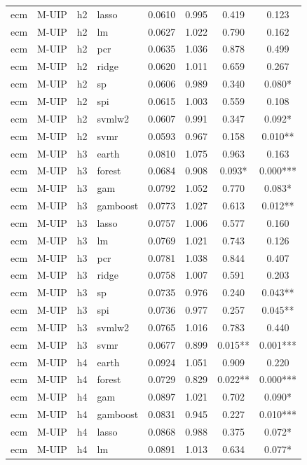 \begin{ThreePartTable}
\begin{longtable}[t]{llclcccc}
ecm & M-UIP & h2 & lasso & 0.0610 & 0.995 & 0.419 & 0.123\\
ecm & M-UIP & h2 & lm & 0.0627 & 1.022 & 0.790 & 0.162\\
ecm & M-UIP & h2 & pcr & 0.0635 & 1.036 & 0.878 & 0.499\\
ecm & M-UIP & h2 & ridge & 0.0620 & 1.011 & 0.659 & 0.267\\
ecm & M-UIP & h2 & sp & 0.0606 & 0.989 & 0.340 & 0.080*\\
ecm & M-UIP & h2 & spi & 0.0615 & 1.003 & 0.559 & 0.108\\
ecm & M-UIP & h2 & svmlw2 & 0.0607 & 0.991 & 0.347 & 0.092*\\
ecm & M-UIP & h2 & svmr & 0.0593 & 0.967 & 0.158 & 0.010**\\
\addlinespace
ecm & M-UIP & h3 & earth & 0.0810 & 1.075 & 0.963 & 0.163\\
ecm & M-UIP & h3 & forest & 0.0684 & 0.908 & 0.093* & 0.000***\\
ecm & M-UIP & h3 & gam & 0.0792 & 1.052 & 0.770 & 0.083*\\
ecm & M-UIP & h3 & gamboost & 0.0773 & 1.027 & 0.613 & 0.012**\\
ecm & M-UIP & h3 & lasso & 0.0757 & 1.006 & 0.577 & 0.160\\
ecm & M-UIP & h3 & lm & 0.0769 & 1.021 & 0.743 & 0.126\\
ecm & M-UIP & h3 & pcr & 0.0781 & 1.038 & 0.844 & 0.407\\
ecm & M-UIP & h3 & ridge & 0.0758 & 1.007 & 0.591 & 0.203\\
ecm & M-UIP & h3 & sp & 0.0735 & 0.976 & 0.240 & 0.043**\\
ecm & M-UIP & h3 & spi & 0.0736 & 0.977 & 0.257 & 0.045**\\
ecm & M-UIP & h3 & svmlw2 & 0.0765 & 1.016 & 0.783 & 0.440\\
ecm & M-UIP & h3 & svmr & 0.0677 & 0.899 & 0.015** & 0.001***\\
\addlinespace
ecm & M-UIP & h4 & earth & 0.0924 & 1.051 & 0.909 & 0.220\\
ecm & M-UIP & h4 & forest & 0.0729 & 0.829 & 0.022** & 0.000***\\
ecm & M-UIP & h4 & gam & 0.0897 & 1.021 & 0.702 & 0.090*\\
ecm & M-UIP & h4 & gamboost & 0.0831 & 0.945 & 0.227 & 0.010***\\
ecm & M-UIP & h4 & lasso & 0.0868 & 0.988 & 0.375 & 0.072*\\
ecm & M-UIP & h4 & lm & 0.0891 & 1.013 & 0.634 & 0.077*\\

\end{longtable}
\end{ThreePartTable}

